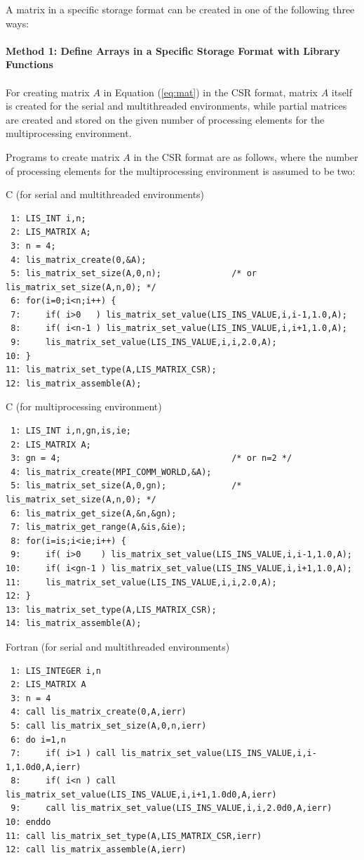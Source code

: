 \documentclass[a4paper]{article}
\begin{document}
A matrix in a specific storage format can be created in one of the
following three ways:\\ \\
\noindent
{\bf Method 1: Define Arrays in a Specific Storage Format with Library Functions}
\\ \\
\indent
For creating matrix $A$ in Equation (\ref{eq:mat}) in the CSR format, 
matrix $A$ itself is created for the serial and multithreaded environments,
while partial matrices are created and 
stored on the given number of processing elements 
for the multiprocessing environment.

Programs to create matrix $A$ in the CSR format are as follows, 
where the number of processing elements for the multiprocessing environment is assumed to be two:
\begin{itembox}[l]{C (for serial and multithreaded environments)}
\small
\begin{verbatim}
 1: LIS_INT i,n;
 2: LIS_MATRIX A;
 3: n = 4;
 4: lis_matrix_create(0,&A);
 5: lis_matrix_set_size(A,0,n);              /* or lis_matrix_set_size(A,n,0); */ 
 6: for(i=0;i<n;i++) {
 7:     if( i>0   ) lis_matrix_set_value(LIS_INS_VALUE,i,i-1,1.0,A);
 8:     if( i<n-1 ) lis_matrix_set_value(LIS_INS_VALUE,i,i+1,1.0,A);
 9:     lis_matrix_set_value(LIS_INS_VALUE,i,i,2.0,A);
10: }
11: lis_matrix_set_type(A,LIS_MATRIX_CSR);
12: lis_matrix_assemble(A);
\end{verbatim}
\end{itembox}
\begin{itembox}[l]{C (for multiprocessing environment)}
\small
\begin{verbatim}
 1: LIS_INT i,n,gn,is,ie;                 
 2: LIS_MATRIX A;
 3: gn = 4;                                  /* or n=2 */
 4: lis_matrix_create(MPI_COMM_WORLD,&A);
 5: lis_matrix_set_size(A,0,gn);             /* lis_matrix_set_size(A,n,0); */
 6: lis_matrix_get_size(A,&n,&gn);
 7: lis_matrix_get_range(A,&is,&ie);
 8: for(i=is;i<ie;i++) {
 9:     if( i>0    ) lis_matrix_set_value(LIS_INS_VALUE,i,i-1,1.0,A);
10:     if( i<gn-1 ) lis_matrix_set_value(LIS_INS_VALUE,i,i+1,1.0,A);
11:     lis_matrix_set_value(LIS_INS_VALUE,i,i,2.0,A);
12: }
13: lis_matrix_set_type(A,LIS_MATRIX_CSR);
14: lis_matrix_assemble(A);
\end{verbatim}
\end{itembox}
\begin{itembox}[l]{Fortran (for serial and multithreaded environments)}
\small
\begin{verbatim}
 1: LIS_INTEGER i,n
 2: LIS_MATRIX A
 3: n = 4
 4: call lis_matrix_create(0,A,ierr)
 5: call lis_matrix_set_size(A,0,n,ierr)
 6: do i=1,n
 7:     if( i>1 ) call lis_matrix_set_value(LIS_INS_VALUE,i,i-1,1.0d0,A,ierr)
 8:     if( i<n ) call lis_matrix_set_value(LIS_INS_VALUE,i,i+1,1.0d0,A,ierr)
 9:     call lis_matrix_set_value(LIS_INS_VALUE,i,i,2.0d0,A,ierr)
10: enddo
11: call lis_matrix_set_type(A,LIS_MATRIX_CSR,ierr)
12: call lis_matrix_assemble(A,ierr)
\end{verbatim}
\end{itembox}
\end{document}
